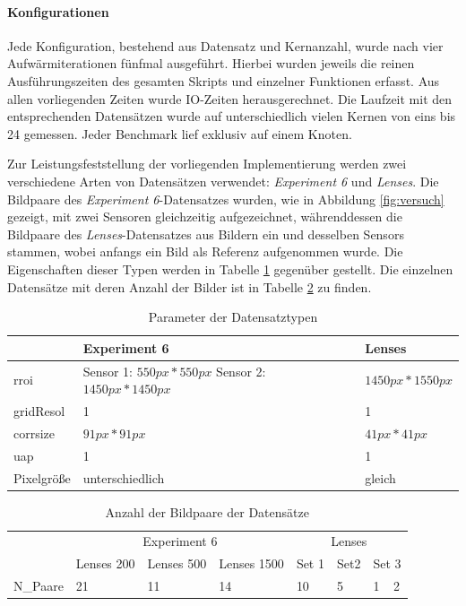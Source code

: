 \paragraph{Konfigurationen}

Jede Konfiguration, bestehend aus Datensatz und Kernanzahl, wurde nach vier Aufwärmiterationen fünfmal ausgeführt. Hierbei wurden jeweils die reinen Ausführungszeiten des gesamten Skripts und einzelner Funktionen erfasst. Aus allen vorliegenden Zeiten wurde \gls{IO}-Zeiten herausgerechnet. Die Laufzeit mit den entsprechenden Datensätzen wurde auf unterschiedlich vielen Kernen von eins bis 24 gemessen. Jeder Benchmark lief exklusiv auf einem Knoten. 

Zur Leistungsfeststellung der vorliegenden Implementierung werden zwei verschiedene Arten von Datensätzen verwendet: \textit{Experiment 6} und \textit{Lenses}. Die Bildpaare des \textit{Experiment 6}-Datensatzes wurden, wie in Abbildung \ref{fig:versuch} gezeigt, mit zwei Sensoren gleichzeitig aufgezeichnet, währenddessen die Bildpaare des \textit{Lenses}-Datensatzes aus Bildern ein und desselben Sensors stammen, wobei anfangs ein Bild als Referenz aufgenommen wurde. Die Eigenschaften dieser Typen werden in Tabelle \ref{tab:dataset_types} gegenüber gestellt. Die einzelnen Datensätze mit deren Anzahl der Bilder ist in Tabelle \ref{tab:datasets} zu finden. 

\begin{table}
	\begin{tabularx}{\textwidth}{@{} XXX @{}}
		\toprule
		& Experiment 6 & Lenses \\
		\hline
		\gls{rroi} & Sensor 1: $550px * 550px$ \newline
		Sensor 2: $1450px * 1450px$  & $1450px * 1550px$ \\
		\gls{gridResol} & 1 & 1 \\
		\gls{corrsize} & $91px * 91px$ & $41px * 41px$ \\
		\gls{uap} & 1 & 1 \\
		Pixelgröße & unterschiedlich & gleich \\
		\bottomrule
	\end{tabularx}
	\caption{Parameter der Datensatztypen}
	\label{tab:dataset_types}
\end{table}

\begin{table}
	\begin{tabularx}{\textwidth}{@{} XXXXXXXX @{}}
		\toprule
		& \multicolumn{3}{c}{Experiment 6} & \multicolumn{4}{c}{Lenses} \\
		\cmidrule(lr){2-4}
		\cmidrule(lr){5-8}
		& Lenses 200 & Lenses 500 & Lenses 1500 & Set 1 & Set2 & \multicolumn{2}{X}{Set 3} \\
		\hline
		\gls{N_Paare} & 21 & 11 & 14 & 10 & 5 & 1 & 2 \\
		\bottomrule
	\end{tabularx}
	\caption{Anzahl der Bildpaare der Datensätze}
	\label{tab:datasets}
\end{table}

